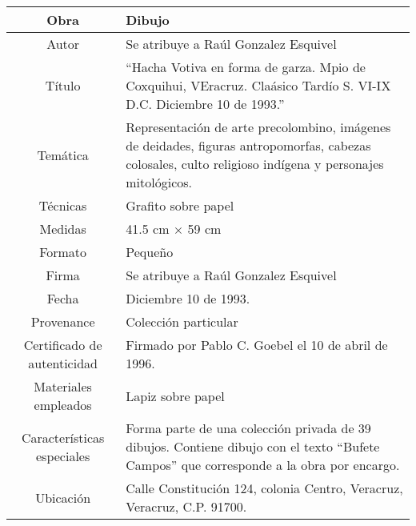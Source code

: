 \documentclass[10pt,letter]{report}
\begin{document}
\begin{table}[H]
\centering
\begin{tabular}{|c|m{}|}
\hline
Obra& Dibujo	\\
\hline
Autor & Se atribuye a Ra\'ul Gonzalez Esquivel\\
\hline
T\'itulo & ``Hacha Votiva en forma de garza. Mpio de Coxquihui, VEracruz. Cla\'asico Tard\'io S. VI-IX D.C. Diciembre 10 de 1993.''\\
\hline
Tem\'atica & Representaci\'on de arte precolombino, im\'agenes de deidades, figuras antropomorfas, cabezas colosales, culto religioso ind\'igena y personajes mitol\'ogicos.\\
\hline
T\'ecnicas &Grafito sobre papel \\
\hline
Medidas & 41.5 cm $\times$ 59 cm \\
\hline
 Formato & Peque\~no \\
 \hline
 Firma & Se atribuye a Ra\'ul Gonzalez Esquivel\\ 
 \hline
  Fecha & Diciembre 10 de 1993.\\
 \hline
 Provenance & Colecci\'on particular\\
 \hline
 Certificado de autenticidad& Firmado por Pablo C. Goebel el 10 de abril de 1996.  \\
 \hline 
  Materiales empleados & Lapiz sobre papel\\
 \hline
 Caracter\'isticas especiales & Forma parte de una colecci\'on privada de 39 dibujos. 
Contiene dibujo con el texto ``Bufete Campos'' que corresponde a la obra por encargo. \\
\hline 
Ubicaci\'on & Calle Constituci\'on 124, colonia Centro, Veracruz, Veracruz, C.P. 91700.\\
\hline

\end{tabular}
\end{table}
\end{document}
